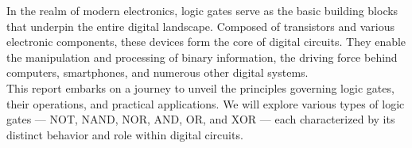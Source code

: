 \abstract
In the realm of modern electronics, logic gates serve as the basic building blocks that underpin the entire digital landscape. 
Composed of transistors and various electronic components, these devices form the core of digital circuits. 
They enable the manipulation and processing of binary information, the driving force behind computers, smartphones, and numerous other digital systems. \\
This report embarks on a journey to unveil the principles governing logic gates, their operations, and practical applications. 
We will explore various types of logic gates — NOT, NAND, NOR, AND, OR, and XOR — each characterized by its distinct behavior and role within digital circuits.